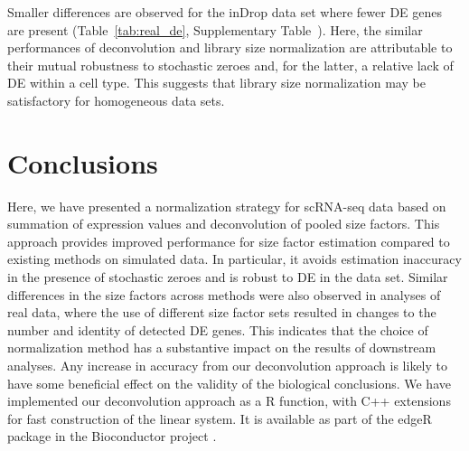 \documentclass{article}
\begin{document}
Smaller differences are observed for the inDrop data set where fewer DE genes are present (Table~\ref{tab:real_de}, Supplementary Table~\supprank{}).
Here, the similar performances of deconvolution and library size normalization are attributable to their mutual robustness to stochastic zeroes and, for the latter, a relative lack of DE within a cell type.
This suggests that library size normalization may be satisfactory for homogeneous data sets.

\section{Conclusions}
Here, we have presented a normalization strategy for scRNA-seq data based on summation of expression values and deconvolution of pooled size factors.
This approach provides improved performance for size factor estimation compared to existing methods on simulated data.
In particular, it avoids estimation inaccuracy in the presence of stochastic zeroes and is robust to DE in the data set.
Similar differences in the size factors across methods were also observed in analyses of real data,
    where the use of different size factor sets resulted in changes to the number and identity of detected DE genes.
This indicates that the choice of normalization method has a substantive impact on the results of downstream analyses.
Any increase in accuracy from our deconvolution approach is likely to have some beneficial effect on the validity of the biological conclusions.
We have implemented our deconvolution approach as a R function, with C++ extensions for fast construction of the linear system.
It is available as part of the edgeR package in the Bioconductor project \cite{huber2015orchestrating}.



\end{document}
